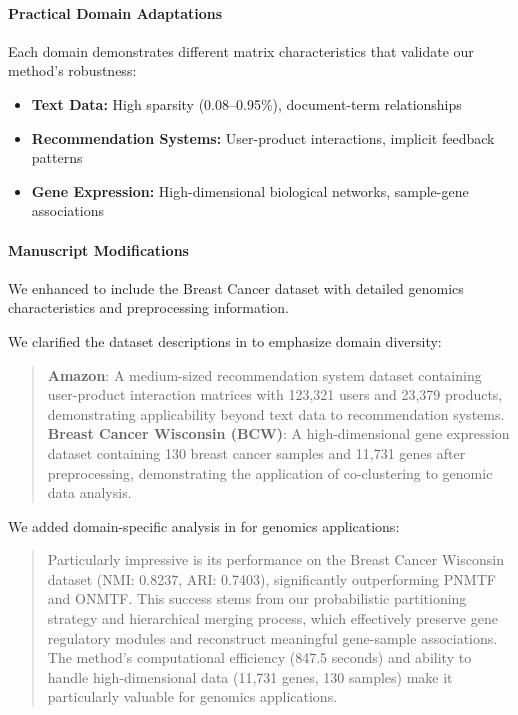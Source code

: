 \documentclass{ar2rc}
\theoremstyle{definition}
\theoremstyle{remark} %
\begin{document}
\paragraph{Practical Domain Adaptations}

Each domain demonstrates different matrix characteristics that validate our method's robustness:
\begin{itemize}
  \item \textbf{Text Data:} High sparsity (0.08--0.95\%), document-term relationships
  \item \textbf{Recommendation Systems:} User-product interactions, implicit feedback patterns
  \item \textbf{Gene Expression:} High-dimensional biological networks, sample-gene associations
\end{itemize}

\paragraph{Manuscript Modifications}

We enhanced  to include the Breast Cancer dataset with detailed genomics characteristics and preprocessing information.

We clarified the dataset descriptions in  to emphasize domain diversity:

\begin{quote}
  \textbf{Amazon}: A medium-sized recommendation system dataset containing user-product interaction matrices with 123,321 users and 23,379 products, demonstrating applicability beyond text data to recommendation systems. \\ 
  \textbf{Breast Cancer Wisconsin (BCW)}: A high-dimensional gene expression dataset containing 130 breast cancer samples and 11,731 genes after preprocessing, demonstrating the application of co-clustering to genomic data analysis.
\end{quote}

We added domain-specific analysis in  for genomics applications:

\begin{quote}
  Particularly impressive is its performance on the Breast Cancer Wisconsin dataset (NMI: 0.8237, ARI: 0.7403), significantly outperforming PNMTF and ONMTF. This success stems from our probabilistic partitioning strategy and hierarchical merging process, which effectively preserve gene regulatory modules and reconstruct meaningful gene-sample associations. The method's computational efficiency (847.5 seconds) and ability to handle high-dimensional data (11,731 genes, 130 samples) make it particularly valuable for genomics applications.
\end{quote}
\end{document}
